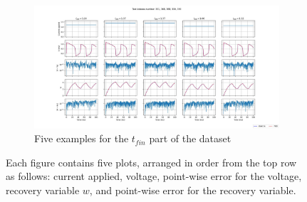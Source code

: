 \documentclass{article}
\begin{document}
\begin{center}
\begin{figure}[ht]
        \begin{subfigure}{.5\textwidth}
            \centering
            \includegraphics[width=1.8\linewidth]{images/t_f_error_FHN.jpg}
            \caption{Five examples for the $t_{fin}$ part of the dataset}
            \label{FHN_err_t_f}
        \end{subfigure}
        \caption{Each figure contains five plots, arranged in order from the top row as follows: current applied, voltage, point-wise error for the voltage, recovery variable $w$, and point-wise error for the recovery variable.}
        \label{Grafici FHN }
    \end{figure}
\end{center}
\clearpage

\newpage
\end{document}
